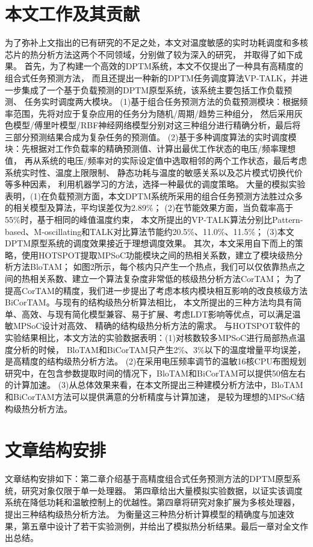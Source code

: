 \section{本文工作及其贡献}
为了弥补上文指出的已有研究的不足之处，本文对温度敏感的实时功耗调度和多核芯片的热分析方法这两个不同领域，分别做了较为深入的研究， 并取得了如下成果。
首先，为了构建一个高效的DPTM系统，本文不仅提出了一种具有高精度的组合式任务预测方法， 而且还提出一种新的DPTM任务调度算法VP-TALK，并进一步集成了一个基于负载预测的DPTM原型系统，该系统主要包括工作负载预测、 任务实时调度两大模块。
(1)基于组合任务预测方法的负载预测模块：根据频率范围，先将对应于复杂应用的任务分为随机/周期/趋势三种组分， 然后采用灰色模型/傅里叶模型/RBF神经网络模型分别对这三种组分进行精确分析，最后将三部分预测结果合成为复杂任务的预测值。
(2)基于多种调度算法的实时调度模块：先根据对工作负载率的精确预测值、计算出最优工作状态的电压/频率理想值， 再从系统的电压/频率对的实际设定值中选取相邻的两个工作状态，最后考虑系统实时性、温度上限限制、 静态功耗与温度的敏感关系以及芯片模式切换代价等多种因素， 利用机器学习的方法，选择一种最优的调度策略。
大量的模拟实验表明，(1)在负载预测方面，本文DPTM系统所采用的组合任务预测方法胜过众多的相关模型及算法，平均误差仅为2.89\%； (2)在节能效果方面，当负载率高于55\%时，基于相同的峰值温度约束， 本文所提出的VP-TALK算法分别比Pattern-based、M-oscillating和TALK对比算法节能约20.5\%、11.0\%、11.5\%； (3)本文DPTM原型系统的调度效果接近于理想调度效果。
其次，本文采用自下而上的策略，使用HOTSPOT提取MPSoC功能模块之间的热相关系数，建立了模块级热分析方法BloTAM； 如图2所示，每个核内只产生一个热点，我们可以仅依靠热点之间的热相关系数、建立一个算法复杂度非常低的核级热分析方法CorTAM； 为了提高CorTAM的精度，我们进一步提出了考虑本核内模块相互影响的改良核级方法BiCorTAM。与现有的结构级热分析算法相比， 本文所提出的三种方法均具有简单、高效、与现有简化模型兼容、易于扩展、考虑LDT影响等优点，可以满足温敏MPSoC设计对高效、 精确的结构级热分析方法的需求。
与HOTSPOT软件的实验结果相比，本文方法的实验数据表明：(1)对核数较多MPSoC进行局部热点温度分析的时候， BloTAM和BiCorTAM只产生2\%、3\%以下的温度增量平均误差，是高精度的结构级热分析方法。 (2)在采用电压频率调节的温敏16核CPU布图规划研究中，在包含参数提取时间的情况下，BloTAM和BiCorTAM可以提供50倍左右的计算加速。 (3)从总体效果来看，在本文所提出三种建模分析方法中，BloTAM和BiCorTAM方法可以提供满意的分析精度与计算加速， 是较为理想的MPSoC结构级热分析方法。

\section{文章结构安排}
文章结构安排如下：第二章介绍基于高精度组合式任务预测方法的DPTM原型系统，研究对象仅限于单一处理器。 第四章给出大量模拟实验数据，以证实该调度系统在降低功耗和温敏控制上的优越性。第四章将研究对象扩展为多核处理器， 提出三种结构级热分析方法。 为衡量这三种热分析计算模型的精确度与加速效果，第五章中设计了若干实验测例，并给出了模拟热分析结果。最后一章对全文作出总结。 